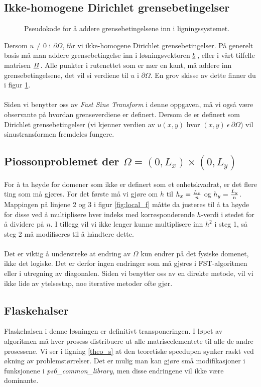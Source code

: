 \documentclass{article}
\newcommand{\ub}[1]{\underbar{$#1$}\,}
\begin{document}
\subsection{Ikke-homogene Dirichlet grensebetingelser}
\begin{figure}[h]
	\centering
	
	\caption{Pseudokode for å addere grensebetingelsene inn i ligningssystemet.}
	\label{fig:non_homogenous_dirichlet}
\end{figure}
Dersom $u \neq 0$ i $\partial\Omega$, får vi ikke-homogene Dirichlet grensebetingelser. På generelt basis må man addere grensebetingelse inn i løsningsvektoren $\ub{b}$, eller i vårt tilfelle matrisen $\ub{B}$. Alle punkter i rutenettet som er nær en kant, må addere inn grensebetingelsene, det vil si verdiene til $u$ i $\partial\Omega$. En grov skisse av dette finner du i figur \ref{fig:non_homogenous_dirichlet}. \\
\\
Siden vi benytter oss av \emph{Fast Sine Transform} i denne oppgaven, må vi også være observante på hvordan grenseverdiene er definert. Dersom de er definert som Dirichlet grensebetingelser (vi kjenner verdien av $u(x, y)$ hvor $(x, y)\ \epsilon\ \partial\Omega$) vil sinustransformen fremdeles fungere.\\

\subsection{Piossonproblemet der $\Omega = (0, L_x) \times (0, L_y)$}
For å ta høyde for domener som ikke er definert som et enhetskvadrat, er det flere ting som må gjøres. For det første må vi gjøre om $h$ til $h_x = {L_x \over n}$ og $h_y = {L_y \over n}$. Mappingen på linjene 2 og 3 i figur \ref{fig:local_f} måtte da justeres til å ta høyde for disse ved å multiplisere hver indeks med korresponderende $h$-verdi i stedet for å dividere på $n$. I tillegg vil vi ikke lenger kunne multiplisere inn $h^2$ i steg 1, så steg 2 må modifiseres til å håndtere dette.\\
\\
Det er viktig å understreke at endring av $\Omega$ kun endrer på det fysiske domenet, ikke det logiske. Det er derfor ingen endringer som må gjøres i FST-algoritmen eller i utregning av diagonalen. Siden vi benytter oss av en direkte metode, vil vi ikke lide av ytelsestap, noe iterative metoder ofte gjør.

\subsection{Flaskehalser}
Flaskehalsen i denne løsningen er definitivt transponeringen. I løpet av algoritmen må hver prosess distribuere ut alle matriseelementete til alle de andre prosessene. Vi ser i ligning \ref{theo_s} at den teoretiske speedupen synker raskt ved økning av problemstørrelser. Det er mulig man kan gjøre små modifikasjoner i funksjonene i \emph{ps6\_common\_library}, men disse endringene vil ikke være dominante.
\end{document}

